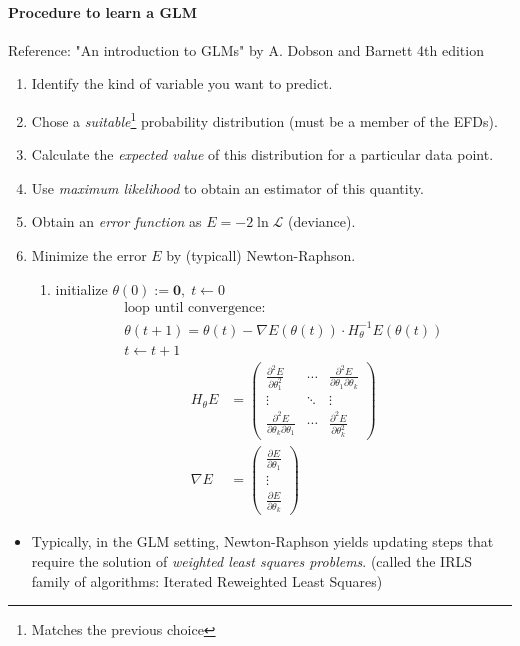 \paragraph{Procedure to learn a GLM}

Reference: "An introduction to GLMs" by A. Dobson and Barnett 4th edition

\newcommand{\dcheckmark}{\checkmark~\hspace{-0.9em}\checkmark}

\begin{enumerate}
  \item Identify the kind of variable you want to predict. \checkmark
  \item Chose a \emph{suitable}\footnote{Matches the previous choice} probability distribution (must be a member of the EFDs). \dcheckmark
  \item Calculate the \emph{expected value} of this distribution for a particular
    data point. \dcheckmark
  \item Use \emph{maximum likelihood} to obtain an estimator of this quantity.
  \item Obtain an \emph{error function} as $E = -2\ln \mathcal{L}$ (deviance).
  \item Minimize the error $E$ by (typicall) Newton-Raphson.
    \begin{enumerate}
      \item initialize $\theta (0) := \boldsymbol 0, \; t \gets 0$
        \begin{align*}
          \text{loop until convergence:} \\
          \theta (t+1) = \theta(t) - \nabla E(\theta(t)) \cdot H_\theta^{-1} E(\theta(t)) \\
          t \gets t + 1
        \end{align*}
        \begin{align*}
          H_\theta E &= \begin{pmatrix}
            \frac{\partial^2 E}{\partial \theta_1^2} & \cdots & \frac{\partial^2 E}{\partial \theta_1 \partial \theta_k} \\
            \vdots & \ddots & \vdots \\
            \frac{\partial^2 E}{\partial \theta_k \partial \theta_1} & \cdots & \frac{\partial^2 E}{\partial \theta_k^2}
          \end{pmatrix} \\
          \nabla E &= \begin{pmatrix}
            \frac{\partial E}{\partial \theta_1} \\
            \vdots \\
            \frac{\partial E}{\partial \theta_k}
          \end{pmatrix}
        \end{align*}
    \end{enumerate}
\end{enumerate}

\begin{itemize}
  \item Typically, in the GLM setting, Newton-Raphson yields updating
    steps that require the solution of \emph{weighted least squares problems}.
    (called the IRLS family of algorithms: Iterated Reweighted Least Squares)
\end{itemize}
